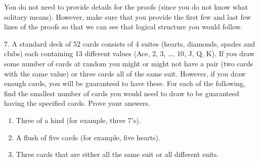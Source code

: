 \documentclass[10pt,]{book}
\theoremstyle{plain}
\theoremstyle{definition}
\theoremstyle{definition}
\theoremstyle{definition}
\numberwithin{equation}{chapter}
\begin{document}
\begin{exerciselist}
            You do not need to provide details for the proofs (since you do not know what solitary means). However, make sure that you provide the first few and last few lines of the proofs so that we can see that logical structure you would follow.
\par\smallskip
\item[7.]\hypertarget{exercise-261}{}
            A standard deck of 52 cards consists of 4 suites (hearts, diamonds, spades and clubs) each containing 13 different values (Ace, 2, 3, \dots{}, 10, J, Q, K). If you draw some number of cards at random you might or might not have a pair (two cards with the same value) or three cards all of the same suit. However, if you draw enough cards, you will be guaranteed to have these. For each of the following, find the smallest number of cards you would need to draw to be guaranteed having the specified cards. Prove your answers.
\leavevmode%
\begin{enumerate}[label=(\alph*)]
\item\hypertarget{li-1193}{}
                Three of a kind (for example, three 7's).


\item\hypertarget{li-1194}{}
                A flush of five cards (for example, five hearts).


\item\hypertarget{li-1195}{}
                Three cards that are either all the same suit or all different suits.



\end{enumerate}
\end{exerciselist}
\end{document}
